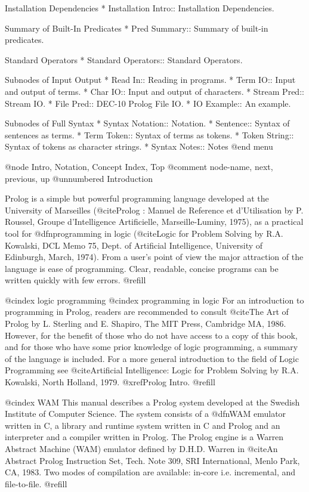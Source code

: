 Installation Dependencies
* Installation Intro:: Installation Dependencies.

Summary of Built-In Predicates
* Pred Summary:: Summary of built-in predicates.

Standard Operators
* Standard Operators:: Standard Operators.

Subnodes of Input Output
* Read In::	Reading in programs.
* Term IO::	Input and output of terms.
* Char IO::	Input and output of characters.
* Stream Pred:: Stream IO.
* File Pred::	DEC-10 Prolog File IO.
* IO Example::	An example.

Subnodes of Full Syntax
* Syntax Notation::	Notation.
* Sentence::	Syntax of sentences as terms.
* Term Token::	Syntax of terms as tokens.
* Token String:: Syntax of tokens as character strings.
* Syntax Notes:: Notes
@end menu


@node Intro, Notation, Concept Index, Top
@comment  node-name,  next,  previous,  up
@unnumbered Introduction

Prolog is a simple but powerful programming language developed at the
University of Marseilles (@cite{Prolog : Manuel de Reference et
d'Utilisation} by P. Roussel, Groupe d'Intelligence Artificielle,
Marseille-Luminy, 1975), as a practical tool for @dfn{programming in
logic} (@cite{Logic for Problem Solving} by R.A. Kowalski, DCL Memo 75,
Dept. of Artificial Intelligence, University of Edinburgh, March, 1974).
From a user's point of view the major attraction of the language is ease
of programming.  Clear, readable, concise programs can be written
quickly with few errors. @refill

@cindex logic programming
@cindex programming in logic
For an introduction to programming in Prolog, readers are recommended to
consult @cite{The Art of Prolog} by L. Sterling and E. Shapiro, The MIT
Press, Cambridge MA, 1986.  However, for the benefit of those who do not
have access to a copy of this book, and for those who have some prior
knowledge of logic programming, a summary of the language is included.
For a more general introduction to the field of Logic Programming see
@cite{Artificial Intelligence: Logic for Problem Solving} by R.A. Kowalski,
North Holland, 1979.  @xref{Prolog Intro}.  @refill

@cindex WAM
This manual describes a Prolog system developed at the Swedish Institute
of Computer Science.  The system consists of a @dfn{WAM} emulator
written in C, a library and runtime system written in C and Prolog and
an interpreter and a compiler written in Prolog.  The Prolog engine is a
Warren Abstract Machine (WAM) emulator defined by D.H.D. Warren in
@cite{An Abstract Prolog Instruction Set}, Tech. Note 309, SRI
International, Menlo Park, CA, 1983.  Two modes of compilation are
available: in-core i.e. incremental, and file-to-file. @refill

